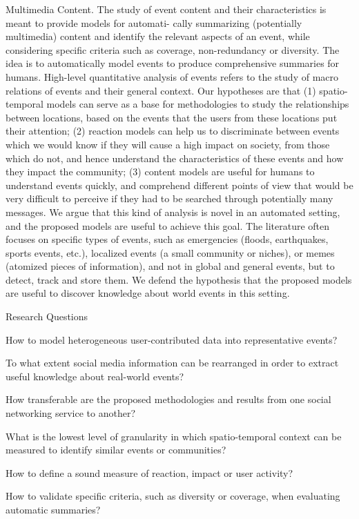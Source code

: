 \begin{intro}
Multimedia Content. The study of event content and their characteristics is
meant to provide models for automati- cally summarizing (potentially multimedia)
content and identify the relevant aspects of an event, while considering
specific criteria such as coverage, non-redundancy or diversity. The idea is to
automatically model events to produce comprehensive summaries for humans.
High-level quantitative analysis of events refers to the study of macro
relations of events and their general context. Our hypotheses are that (1)
spatio-temporal models can serve as a base for methodologies to study the
relationships between locations, based on the events that the users from these
locations put their attention; (2) reaction models can help us to discriminate
between events which we would know if they will cause a high impact on society,
from those which do not, and hence understand the characteristics of these
events and how they impact the community; (3) content models are useful for
humans to understand events quickly, and comprehend different points of view
that would be very difficult to perceive if they had to be searched through
potentially many messages. We argue that this kind of analysis is novel in an
automated setting, and the proposed models are useful to achieve this goal. The
literature often focuses on specific types of events, such as emergencies
(floods, earthquakes, sports events, etc.), localized events (a small community
or niches), or memes (atomized pieces of information), and not in global and
general events, but to detect, track and store them. We defend the hypothesis
that the proposed models are useful to discover knowledge about world events in
this setting.


Research Questions 

How to model heterogeneous user-contributed data into representative events? 

To what extent social media information can be rearranged in order to extract
useful knowledge about real-world events? 

How transferable are the proposed methodologies and results from one social
networking service to another? 

What is the lowest level of granularity in which spatio-temporal context can be
measured to identify similar events or communities?

How to define a sound measure of reaction, impact or user activity? 

How to validate specific criteria, such as diversity or coverage, when
evaluating automatic summaries? 


\end{intro}
